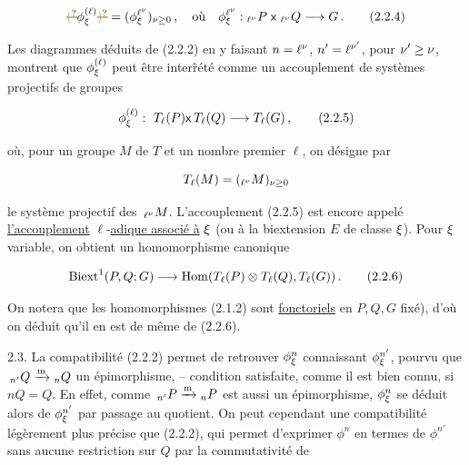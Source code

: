 \[\deleted{\unsure{(}}\phi_{\handwritten{\xi}}^{(\ell)}\deleted{\unsure{)}}=(\phi_{\handwritten{\xi}}^{\ell^{\handwritten{\nu}}})_{\handwritten{\nu\geq}0}\,,\quad\text{où}\quad \phi_{\handwritten{\xi}}^{\ell^{\handwritten{\nu}}}:{}_{\ell^{\handwritten{\nu}}}P\;\mathsf{x}\;{}_{\ell^{\handwritten{\nu}}}Q\handwritten{\longrightarrow}G\,.\tag*{(2.2.4)}\]

Les diagrammes déduits de (2.2.2) en y faisant $n=\ell^{\nu}$, $n'=\ell^{\nu'}$, pour $\nu'\geq\nu$, montrent que $\phi_{\xi}^{(\ell)}$ peut être interr̂été comme un accouplement de  systèmes projectifs de groupes

\[\phi_{\handwritten{\xi}}^{(\ell)}:\ T_\ell(P)\mathsf{x}\,T_\ell(Q)\handwritten{\longrightarrow}T_\ell(G)\,,\tag*{(2.2.5)}\]

où, pour un groupe $M$ de $T$ et un nombre premier $\ell$, on désigne par

\[T_\ell(M)=({}_{\ell^{\nu}}M)_{\nu\geq0}\]

le système p\deleted{\unsure{(}}rojectif des $\,{}_{\ell^{\nu}}M$. L'accouplement  (2.2.5) est encore appelé \uline{l'accouplement} $\ell$-\uline{adique associé à} $\xi$ (ou à la biextension $E$ de classe $\xi$). Pour $\xi$ variable, on obtient un homomorphisme canonique

\[\mathrm{Biext}^{1}(P,Q;G)\longrightarrow\mathrm{Hom}(T_\ell(P)\otimes T_\ell(Q),T_\ell(G))\,.\tag*{(2.2.6)}\]

On notera que les homomorphismes (2.1.2) sont \uline{fonctoriels} en $P,Q,G$  fixé), d'où on déduit qu'il en est de même de (2.2.6).

2.3.\qquad {} La compatibilité (2.2.2) permet de retrouver $\phi_{\xi}^n$ connaissant $\phi_{\xi}^{n'}$, pourvu que $\,{}_{n'}Q\xrightarrow{\mathrm m}{}_nQ$  un épimorphisme, --  condition satisfaite, comme il est bien connu, si $nQ=Q$. En effet, comme $\,{}_{n'}P\xrightarrow{\mathrm m}{}_nP$ est aussi un épimorphisme, $\phi_{\xi}^n$ se déduit alors de $\phi_{\xi}^{n'}$ par passage au quotient. On peut cependant  une compatibilité légèrement plus précise que (2.2.2), qui permet d'exprimer $\phi^n$ en termes de $\phi^{n'}$ sans aucune restriction sur $Q$\handwritten{,} par la commutativité de


